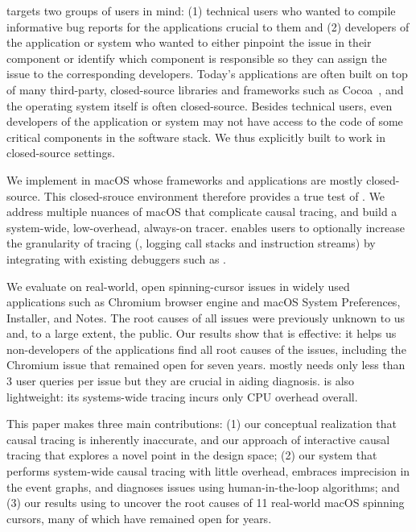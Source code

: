 \xxx targets two groups of users in mind: (1) technical users who wanted
to compile informative bug reports for the applications crucial to them
and (2) developers of the application or system who wanted to either
pinpoint the issue in their component or identify which component is
responsible so they can assign the issue to the corresponding developers.
Today's applications are often built on top of many third-party,
closed-source libraries and frameworks such as Cocoa~\cite{cocoa}, and the
operating system itself is often closed-source.  Besides technical users,
even developers of the application or system may not have access to the
code of some critical components in the software stack.  We thus
explicitly built \xxx to work in closed-source settings.

We implement \xxx in macOS whose frameworks and applications are mostly
closed-source. This closed-srouce environment therefore provides a true
test of \xxx. We address multiple nuances of macOS that complicate causal
tracing, and build a system-wide, low-overhead, always-on tracer. \xxx
enables users to optionally increase the granularity of tracing (\eg,
logging call stacks and instruction streams) by integrating with existing
debuggers such as .

We evaluate \xxx on \nbug real-world, open spinning-cursor issues in widely
used applications such as Chromium browser engine and macOS System Preferences,
Installer, and Notes. The root causes of all \nbug issues were previously
unknown to us and, to a large extent, the public. Our results show that \xxx is
effective: it helps us non-developers of the applications find all root causes
of the issues, including the Chromium issue that remained open for seven years.
\xxx mostly needs only less than 3 user queries per issue but they are crucial
in aiding diagnosis. \xxx is also lightweight: its systems-wide tracing incurs
only \cpuoverhead CPU overhead overall.


This paper makes three main contributions: (1) our conceptual realization
that causal tracing is inherently inaccurate, and our approach of
interactive causal tracing that explores a novel point in the design
space; (2) our system \xxx that performs system-wide causal tracing with
little overhead, embraces imprecision in the event graphs, and diagnoses
issues using human-in-the-loop algorithms; and (3) our results using \xxx
to uncover the root causes of 11 real-world macOS spinning cursors, many
of which have remained open for years.

